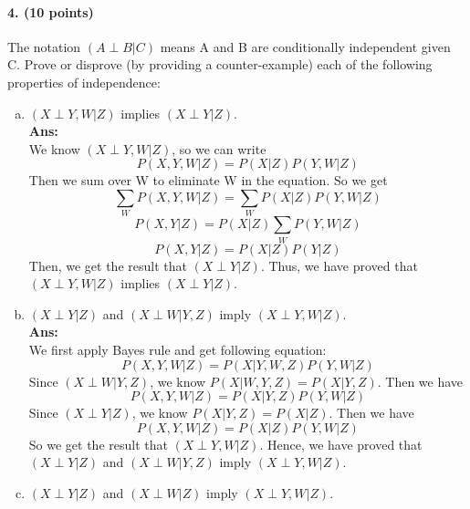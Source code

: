 \documentclass[11pt]{article}
\begin{document}
\paragraph{4. (10 points)} 
The notation $(A \perp B | C)$ means A and B are conditionally independent given C.
Prove or disprove (by providing a counter-example) each of the following properties of independence:
\begin{enumerate}[(a)]
\item $(X\perp  Y, W | Z)$ implies $(X\perp  Y | Z)$.\\
\textbf{Ans:}\\
We know $(X\perp  Y, W | Z)$, so we can write 
$$P(X, Y, W | Z) = P(X|Z)P(Y, W|Z)$$
Then we sum over W to eliminate W in the equation. So we get 
$$\sum_W P(X, Y, W | Z) = \sum_W P(X|Z)P(Y, W|Z)$$
$$P(X, Y|Z) = P(X|Z)\sum_W P(Y, W|Z)$$
$$P(X, Y|Z) = P(X|Z)P(Y|Z)$$
Then, we get the result that $(X\perp  Y | Z)$. Thus, we have proved that $(X\perp  Y, W | Z)$ implies $(X\perp  Y | Z)$.
\item $(X\perp Y | Z)$ and $(X \perp W | Y,Z)$ imply $(X\perp Y,W | Z)$.\\
\textbf{Ans:}\\
We first apply Bayes rule and get following equation:
$$P(X, Y, W | Z) = P(X | Y, W, Z)P(Y, W | Z)$$
Since $(X \perp W | Y,Z)$, we know $P(X|W, Y, Z) = P(X|Y, Z)$. Then we have 
$$P(X, Y, W | Z) = P(X | Y, Z)P(Y, W | Z)$$
Since $(X\perp Y | Z)$, we know $P(X|Y, Z) = P(X|Z)$. Then we have 
$$P(X, Y, W | Z) = P(X | Z)P(Y, W | Z)$$
So we get the result that $(X\perp Y,W | Z)$. Hence, we have proved that\\
$(X\perp Y | Z)$ and $(X \perp W | Y,Z)$ imply $(X\perp Y,W | Z)$.
\item $(X\perp Y | Z)$ and $(X \perp W | Z)$ imply $(X\perp Y,W | Z)$.
\end{enumerate}
\end{document}
